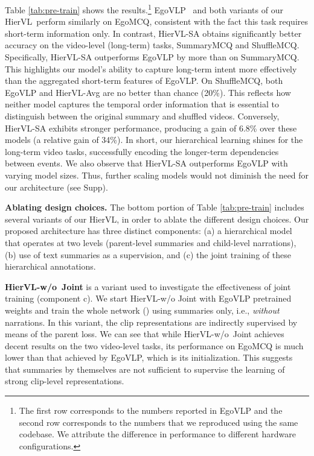 \documentclass[10pt,twocolumn,letterpaper]{article}
\newcommand{\KAcamera}[1]{{\color{black}{}#1}}
\newcommand{\modelname}[0]{{HierVL}}
\begin{document}
Table \ref{tab:pre-train} shows the results.\footnote{The first row corresponds to the numbers reported in EgoVLP \cite{egovlp} and the second row corresponds to the numbers that we reproduced using the same codebase. We attribute the difference in performance to different hardware configurations.} EgoVLP~\cite{egovlp} and both variants of our \modelname~perform similarly on EgoMCQ, consistent with the fact this task requires short-term information only. In contrast, \modelname-SA obtains significantly better accuracy on the video-level (long-term) tasks, SummaryMCQ and ShuffleMCQ. Specifically, \modelname-SA outperforms EgoVLP by more than   on SummaryMCQ. This highlights our model's ability to capture long-term intent more effectively than the aggregated short-term features of EgoVLP. On ShuffleMCQ, both EgoVLP and \modelname-Avg are no better than chance (20\%). This reflects how neither model captures the temporal order information that is essential to distinguish between the original summary and shuffled videos. Conversely, \modelname-SA exhibits stronger performance, producing a gain of 6.8\% over these models (a relative gain of 34\%).   In short, our hierarchical learning shines for the long-term video tasks, successfully encoding the longer-term dependencies between events. \KAcamera{We also observe that HierVL-SA outperforms EgoVLP with varying model sizes. Thus, further scaling models would not diminish the need for our architecture (see Supp).}

\noindent \textbf{Ablating design choices.} 
The bottom portion of  Table \ref{tab:pre-train} includes several variants of our \modelname, in order to ablate the different design choices. Our proposed architecture has three distinct components: (a) a hierarchical model that operates at two levels (parent-level summaries and child-level narrations), (b) use of text summaries as a supervision, and (c) the joint training of these hierarchical annotations. 

\textbf{\modelname-w/o~Joint} is a variant used to investigate the effectiveness of joint training (component c). We start \modelname-w/o Joint  with EgoVLP pretrained weights and train the whole network () using summaries only, i.e., {\em without} narrations. In this variant, the clip representations are indirectly supervised by means of the parent loss. We can see that while \modelname-w/o~Joint achieves decent results on the two video-level tasks, its performance on EgoMCQ is much lower than that achieved by EgoVLP, which is its initialization. This suggests that summaries by themselves are not sufficient to supervise the learning of strong clip-level representations. 
\end{document}
